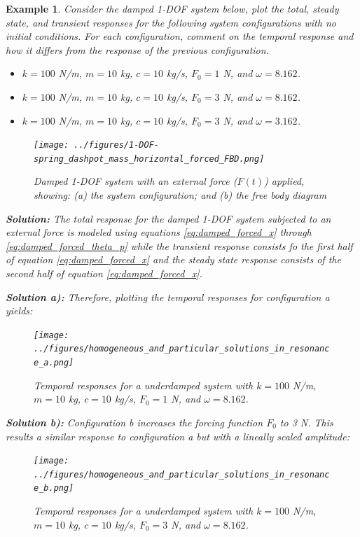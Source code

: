 \documentclass[12pt,letter]{article}
\newtheorem{ex}{Example}
\numberwithin{ex}{section} %
\newenvironment{example}{\begin{mdframed}[middlelinewidth=0.5mm]\begin{ex}\normalfont}{\end{ex}\end{mdframed}}
\numberwithin{re}{section} %
\numberwithin{pr}{section} %
\begin{document}
			\begin{example}
			\label{ex:homogeneous_and_particular_solutions_in_resonance}		
				Consider the damped 1-DOF system below, plot the total, steady state, and transient responses for the following system configurations with no initial conditions. For each configuration, comment on the temporal response and how it differs from the response of the previous configuration.    
				
				\begin{itemize}
				\item[a)] $k=100$ N/m, $m=10$ kg,  $c=10$ kg/s, $F_0=1$ N, and $\omega = 8.162$.
				\item[b)] $k=100$ N/m, $m=10$ kg,  $c=10$ kg/s, $F_0=3$ N, and $\omega = 8.162$.
				\item[c)] $k=100$ N/m, $m=10$ kg,  $c=10$ kg/s, $F_0=3$ N, and $\omega = 3.162$.
				\end{itemize}
				
				\begin{figure}[H]
					\centering
					\texttt{[image: ../figures/1-DOF-spring\_dashpot\_mass\_horizontal\_forced\_FBD.png]}
					\caption{Damped 1-DOF system with an external force ($F(t)$) applied, showing: (a) the system configuration; and (b) the free body diagram}
				\end{figure}
				
				\noindent\textbf{Solution:} The total response for the damped 1-DOF system subjected to an external force is modeled using equations \ref{eq:damped_forced_x} through \ref{eq:damped_forced_theta_p} while the transient response consists fo the first half of equation \ref{eq:damped_forced_x} and the steady state response consists of the second half of equation \ref{eq:damped_forced_x}.  
				
				
				\noindent\textbf{Solution a):} Therefore, plotting the temporal responses for configuration a yields:
				\begin{figure}[H]
					\centering
					\texttt{[image: ../figures/homogeneous\_and\_particular\_solutions\_in\_resonance\_a.png]}
					\caption{Temporal responses for a underdamped system with $k=100$ N/m, $m=10$ kg,  $c=10$ kg/s, $F_0=1$ N, and $\omega = 8.162$.}
				\end{figure}			
				 
				\noindent\textbf{Solution b):} Configuration b increases the forcing function $F_0$ to 3 N. This results a similar response to configuration a but with a lineally scaled amplitude:
				\begin{figure}[H]
					\centering
					\texttt{[image: ../figures/homogeneous\_and\_particular\_solutions\_in\_resonance\_b.png]}
					\caption{Temporal responses for a underdamped system with $k=100$ N/m, $m=10$ kg,  $c=10$ kg/s, $F_0=3$ N, and $\omega = 8.162$.}
				\end{figure}			
				

\end{example}
\end{document}
